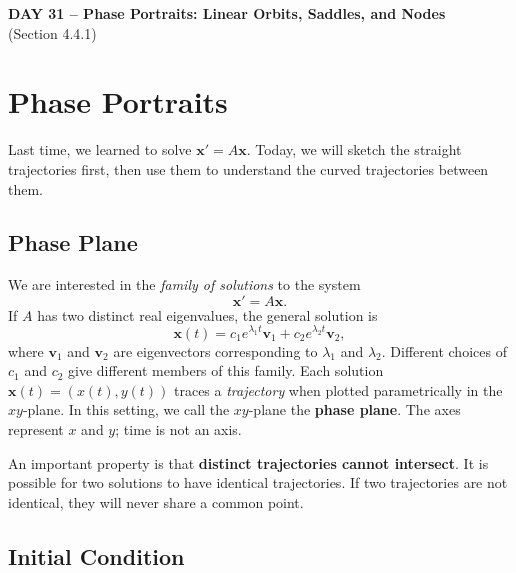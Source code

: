 \documentclass[11pt,letterpaper]{article}
\begin{document}
\begin{center}\Large\textbf{DAY 31 -- Phase Portraits: Linear Orbits, Saddles, and Nodes}\\
\normalsize (Section 4.4.1)\end{center}


\section{Phase Portraits}


Last time, we learned to solve $\mathbf{x}'=A\mathbf{x}$.
Today, we will sketch the straight trajectories first, then use them
to understand the curved trajectories between them.

\subsection{Phase Plane}

We are interested in the \textit{family of solutions}
to the system
\[
    \mathbf{x}'=A\mathbf{x}.
\]
If $A$ has two distinct real eigenvalues, the general
solution is
\begin{equation}    \label{1}
    \mathbf{x}(t)
    =c_1e^{\lambda_1t}\mathbf{v}_1
    +c_2e^{\lambda_2t}\mathbf{v}_2,
\end{equation}
where $\mathbf{v}_1$ and $\mathbf{v}_2$ are eigenvectors
corresponding to $\lambda_1$ and $\lambda_2$.
Different choices of $c_1$ and $c_2$ give different
members of this family. Each solution $\mathbf{x}(t)=(x(t),y(t))$
traces a \textit{trajectory} when plotted parametrically
in the $xy$-plane. In this setting, we call the
$xy$-plane the \textbf{phase plane}.
The axes represent $x$ and $y$; time is not an axis.

An important property is that \textbf{distinct trajectories
cannot intersect}. It is possible for two solutions to have identical trajectories. If two trajectories are not identical, they will never share a common point.

\subsection{Initial Condition}
\end{document}
